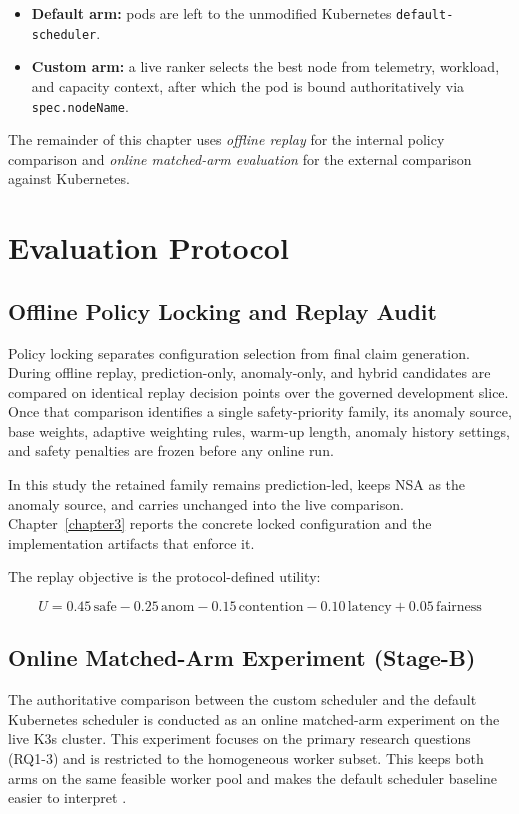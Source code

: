 \begin{itemize}
\item \textbf{Default arm:} pods are left to the unmodified Kubernetes \texttt{default-scheduler}.
\item \textbf{Custom arm:} a live ranker selects the best node from telemetry, workload, and capacity context, after which the pod is bound authoritatively via \texttt{spec.nodeName}.
\end{itemize}

The remainder of this chapter uses \emph{offline replay} for the internal policy comparison and \emph{online matched-arm evaluation} for the external comparison against Kubernetes.


\section{Evaluation Protocol}

\subsection{Offline Policy Locking and Replay Audit}
\label{sec:offline-selection}

Policy locking separates configuration selection from final claim generation. During offline replay, prediction-only, anomaly-only, and hybrid candidates are compared on identical replay decision points over the governed development slice. Once that comparison identifies a single safety-priority family, its anomaly source, base weights, adaptive weighting rules, warm-up length, anomaly history settings, and safety penalties are frozen before any online run.

In this study the retained family remains prediction-led, keeps NSA as the anomaly source, and carries unchanged into the live comparison. Chapter~\ref{chapter3} reports the concrete locked configuration and the implementation artifacts that enforce it.

The replay objective is the protocol-defined utility:

\[
U = 0.45\,\text{safe} - 0.25\,\text{anom} - 0.15\,\text{contention} - 0.10\,\text{latency} + 0.05\,\text{fairness}
\]


\subsection{Online Matched-Arm Experiment (Stage-B)}

The authoritative comparison between the custom scheduler and the default Kubernetes scheduler is conducted as an online matched-arm experiment on the live K3s cluster. This experiment focuses on the primary research questions (RQ1-3) and is restricted to the homogeneous worker subset. This keeps both arms on the same feasible worker pool and makes the default scheduler baseline easier to interpret \cite{liu2024dynamic}.

